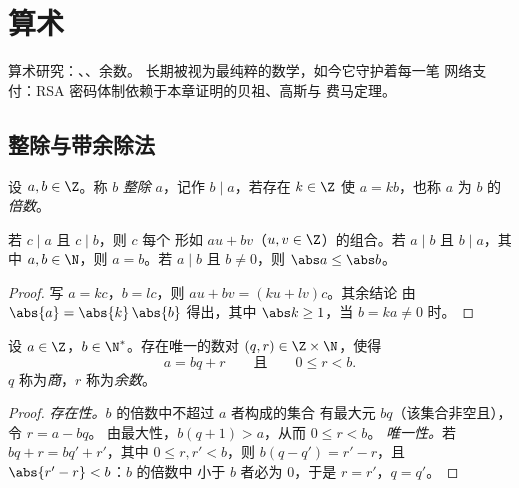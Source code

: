 \chapter{算术}\label{ch:g12:arith}

算术研究：、、余数。
长期被视为最纯粹的数学，如今它守护着每一笔
网络支付：RSA 密码体制依赖于本章证明的贝祖、高斯与
费马定理。

\section{整除与带余除法}

\begin{definition}[整除]\label{def:g12:arith:divides}
设 $a, b \in \Z$。称 $b$ \emph{整除} $a$，记作
$b \mid a$，若存在 $k \in \Z$ 使 $a = kb$，也称 $a$ 为 $b$ 的
\emph{倍数}。
\end{definition}

\begin{proposition}\label{prop:g12:arith:divprops}
若 $c \mid a$ 且 $c \mid b$，则 $c$ 每个
形如 $au + bv$（$u, v \in \Z$）的组合。若 $a \mid b$ 且 $b \mid a$，其中
$a,b \in \N$，则 $a = b$。若 $a \mid b$ 且 $b \neq 0$，则 $\abs a \leq \abs b$。
\end{proposition}

\begin{proof}
写 $a = kc$，$b = lc$，则 $au + bv = (ku + lv)c$。其余结论
由 $\abs{a} = \abs{k}\,\abs{b}$ 得出，其中
$\abs k \geq 1$，当 $b = ka \neq 0$ 时。
\end{proof}

\begin{theorem}[带余除法]\label{thm:g12:arith:euclid}
设 $a \in \Z$，$b \in \N^*$。存在唯一的数对
$(q, r) \in \Z \times \N$，使得
\[
a = bq + r \qquad\text{且}\qquad 0 \leq r < b .
\]
$q$ 称为\emph{商}，$r$ 称为\emph{余数}。
\end{theorem}

\begin{proof}
\emph{存在性。}$b$ 的倍数中不超过 $a$ 者构成的集合
有最大元 $bq$（该集合非空且），令 $r = a - bq$。
由最大性，$b(q+1) > a$，从而 $0 \leq r < b$。
\emph{唯一性。}若 $bq + r = bq' + r'$，其中 $0 \leq r, r' < b$，则
$b(q - q') = r' - r$，且 $\abs{r' - r} < b$：$b$ 的倍数中
小于 $b$ 者必为 $0$，于是 $r = r'$，$q = q'$。
\end{proof}

